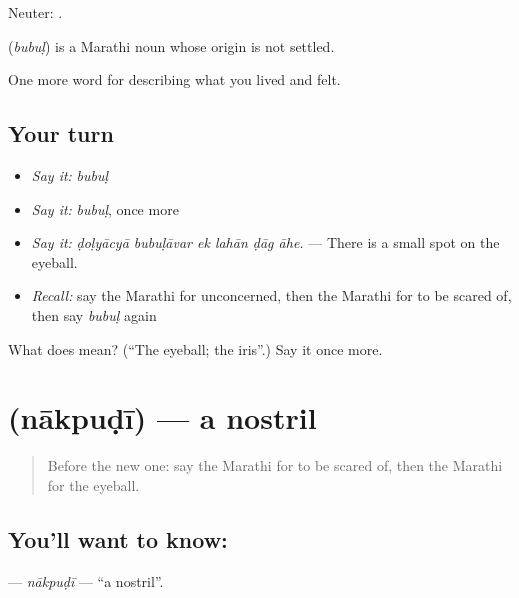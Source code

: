 Neuter:  .

\begin{cousinweb}
\textbf{} (\emph{bubuḷ}) is a Marathi noun whose origin is not settled.
\end{cousinweb}

\begin{grammarlens}[title={What you've built}]
One more word for describing what you lived and felt.
\end{grammarlens}

\subsection*{Your turn}
\begin{itemize}
\raggedright
  \item \emph{Say it:} \emph{bubuḷ}
  \item \emph{Say it:} \emph{bubuḷ}, once more
  \item \emph{Say it:} \emph{ḍoḷyācyā bubuḷāvar ek lahān ḍāg āhe.} — There is a small spot on the eyeball.
  \item \emph{Recall:} say the Marathi for unconcerned, then the Marathi for to be scared of, then say \emph{bubuḷ} again
\end{itemize}

\begin{tcolorbox}[breakable,colback=teal!4,colframe=teal!35!black,title={Before you move on}]
What does  mean? (\textquotedblleft{}The eyeball; the iris\textquotedblright{}.) Say it once more.
\end{tcolorbox}
\section[\texorpdfstring{\mr{नाकपुडी} (nākpuḍī)}{नाकपुडी (nākpuḍī)}]{ (nākpuḍī) — a nostril}

\label{lesson:MR-C476-nakpudi}



\begin{quote}
Before the new one: say the Marathi for to be scared of, then the Marathi for the eyeball.
\end{quote}

\subsection*{You'll want to know: }
\textbf{} — \emph{nākpuḍī} — \textquotedblleft{}a nostril\textquotedblright{}.

